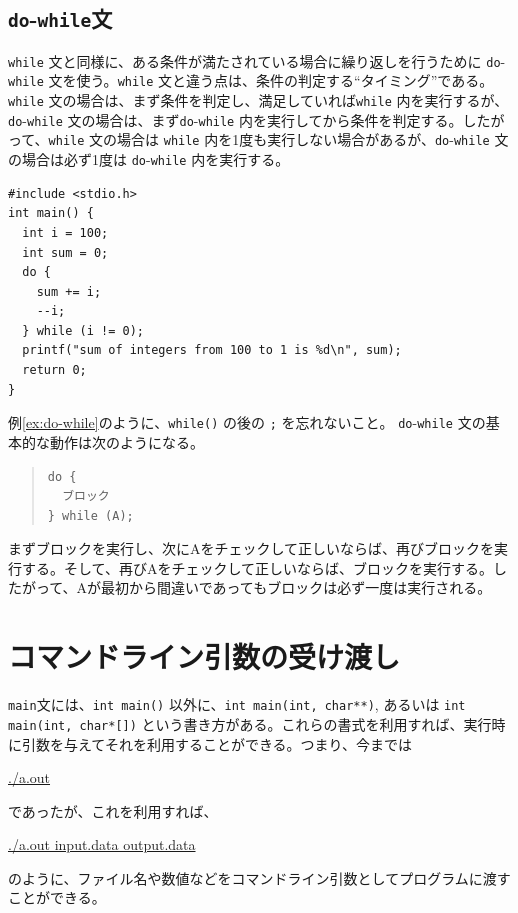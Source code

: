 \subsection{{\tt do}-{\tt while}文}

\verb|while| 文と同様に、ある条件が満たされている場合に繰り返しを行うために \verb|do|-\verb|while| 文を使う。\verb|while| 文と違う点は、条件の判定する``タイミング''である。\verb|while| 文の場合は、まず条件を判定し、満足していれば\verb|while| 内を実行するが、\verb|do|-\verb|while| 文の場合は、まず\verb|do|-\verb|while| 内を実行してから条件を判定する。したがって、\verb|while| 文の場合は \verb|while| 内を1度も実行しない場合があるが、\verb|do|-\verb|while| 文の場合は必ず1度は \verb|do|-\verb|while| 内を実行する。
\begin{reidai}\label{ex:do-while}
\begin{verbatim}
#include <stdio.h>
int main() {
  int i = 100;
  int sum = 0;
  do {
    sum += i;
    --i;
  } while (i != 0);
  printf("sum of integers from 100 to 1 is %d\n", sum);
  return 0;
}
\end{verbatim}
\end{reidai} \noindent
例\ref{ex:do-while}のように、\verb|while()| の後の \verb|;| を忘れないこと。
\verb|do|-\verb|while| 文の基本的な動作は次のようになる。
\begin{quote}
\begin{verbatim}
do {
  ブロック
} while (A);
\end{verbatim}
\end{quote}
まずブロックを実行し、次にAをチェックして正しいならば、再びブロックを実行する。そして、再びAをチェックして正しいならば、ブロックを実行する。したがって、Aが最初から間違いであってもブロックは必ず一度は実行される。

\section{コマンドライン引数の受け渡し}
{\tt main}文には、\verb|int main()| 以外に、\verb|int main(int, char**)|, あるいは \verb|int main(int, char*[])| という書き方がある。これらの書式を利用すれば、実行時に引数を与えてそれを利用することができる。つまり、今までは
\begin{commandline2}
\prompt \underline{./a.out}
\end{commandline2} \noindent
であったが、これを利用すれば、
\begin{commandline2}
\prompt \underline{./a.out input.data output.data}
\end{commandline2} \noindent
のように、ファイル名や数値などをコマンドライン引数としてプログラムに渡すことができる。

